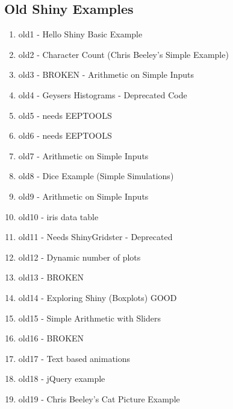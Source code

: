 \documentclass[a4paper,12pt]{article}
\begin{document}
\subsection*{Old Shiny Examples}

\begin{enumerate}

\item old1 - Hello Shiny Basic Example
\item old2 - Character Count (Chris Beeley's Simple Example)
\item old3 - BROKEN - Arithmetic on Simple Inputs
\item old4 - Geysers Histograms - Deprecated Code
\item old5 - needs EEPTOOLS 
\item old6 - needs EEPTOOLS
\item old7 - Arithmetic on Simple Inputs
\item old8 - Dice Example (Simple Simulations)
\item old9 - Arithmetic on Simple Inputs
\item old10 - iris data table
\item old11 - Needs ShinyGridster - Deprecated
\item old12 - Dynamic number of plots
\item old13 - BROKEN
\item old14 - Exploring Shiny (Boxplots)  GOOD
\item old15 - Simple Arithmetic with Sliders
\item old16 - BROKEN
\item old17 - Text based animations
\item old18 - jQuery example
\item old19 - Chris Beeley's Cat Picture Example
\end{enumerate}
\end{document}
